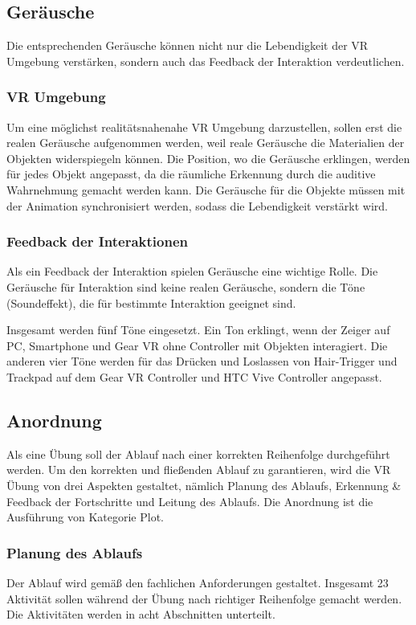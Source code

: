  \subsection{Geräusche}
 Die entsprechenden Geräusche können nicht nur die Lebendigkeit der VR Umgebung verstärken, sondern auch das Feedback der Interaktion verdeutlichen.
 \subsubsection{VR Umgebung}
 Um eine möglichst realitätsnahenahe VR Umgebung darzustellen, sollen erst die realen Geräusche aufgenommen werden, weil reale Geräusche die Materialien der Objekten widerspiegeln können. Die Position, wo die Geräusche erklingen, werden für jedes Objekt angepasst, da die räumliche Erkennung durch die auditive Wahrnehmung gemacht werden kann. Die Geräusche für die Objekte müssen mit der Animation synchronisiert werden, sodass die Lebendigkeit verstärkt wird.
 
 \subsubsection{Feedback der Interaktionen}
 Als ein Feedback der Interaktion spielen Geräusche eine wichtige Rolle. Die Geräusche für Interaktion sind keine realen Geräusche, sondern die Töne (Soundeffekt), die für bestimmte Interaktion geeignet sind.
 
 Insgesamt werden fünf Töne eingesetzt. Ein Ton erklingt, wenn der Zeiger auf PC, Smartphone und Gear VR ohne Controller mit Objekten interagiert. Die anderen vier Töne werden für das Drücken und Loslassen von Hair-Trigger und Trackpad auf dem Gear VR Controller und HTC Vive Controller angepasst.
 
 \subsection{Anordnung}
 Als eine Übung soll der Ablauf nach einer korrekten Reihenfolge durchgeführt werden. Um den korrekten und fließenden Ablauf zu garantieren, wird die VR Übung von drei Aspekten gestaltet, nämlich Planung des Ablaufs, Erkennung \& Feedback der Fortschritte und Leitung des Ablaufs. Die Anordnung ist die Ausführung von Kategorie \glqq Plot\grqq.
  \subsubsection{Planung des Ablaufs}
      
  Der Ablauf wird gemäß den fachlichen Anforderungen gestaltet. Insgesamt 23 Aktivität sollen während der Übung nach richtiger Reihenfolge gemacht werden. Die Aktivitäten werden in acht Abschnitten unterteilt.
  
